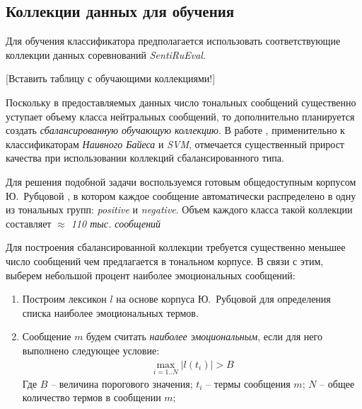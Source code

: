 \subsection{Коллекции данных для обучения}
    Для обучения классификатора предполагается использовать соответствующие
    коллекции данных соревнований {\it SentiRuEval}.

    [Вставить таблицу с обучающими коллекциями!]

    Поскольку в предоставляемых
    данных число тональных сообщений существенно уступает объему класса
    нейтральных сообщений, то дополнительно планируется создать {\it сбалансированную
    обучающую коллекцию}.
    В работе \cite{diploma2015}, применительно к классификаторам {\it
    Наивного Байеса} и {\it SVM}, отмечается существенный прирост качества при
    использовании коллекций сбалансированного типа.

    Для решения подобной задачи воспользуемся готовым общедоступным корпусом Ю.~Рубцовой
    \cite{rubtsovaCollection}, в
    котором каждое сообщение автоматически распределено в одну из тональных групп:
    {\it positive} и {\it negative}.
    Объем каждого класса такой коллекции составляет {\it $\approx$ 110 тыс.
    сообщений}

    Для построения сбалансированной коллекции требуется существенно меньшее
    число сообщений чем предлагается в тональном корпусе.
    В связи с этим, выберем небольшой процент наиболее эмоциональных сообщений:
    \begin{enumerate}
        \item Построим лексикон $l$ на основе корпуса Ю.~Рубцовой для определения
            списка наиболее эмоциональных термов.
        \item Сообщение $m$ будем считать {\it наиболее эмоциональным},
            если для него выполнено следующее условие:
            \begin{gather}
                \max\limits_{i=1..N} |l(t_i)| > B
            \end{gather}
            Где $B$ -- величина порогового значения; \hspace{0.5pt}
            $t_i$ -- термы сообщения $m$; \hspace{0.5pt}
            $N$ -- общее количество термов в сообщении $m$;
    \end{enumerate}
